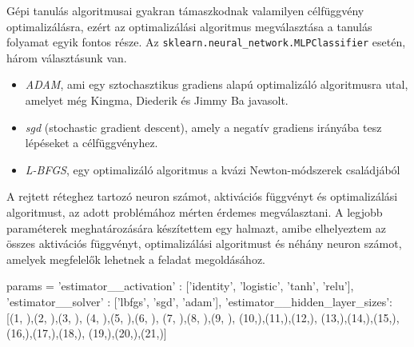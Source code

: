 Gépi tanulás algoritmusai gyakran támaszkodnak valamilyen célfüggvény optimalizálásra, ezért az optimalizálási algoritmus megválasztása a tanulás folyamat egyik fontos része.
Az \texttt{sklearn.neural\_network.MLPClassifier} esetén, három választásunk van.
\begin{itemize}
\item \textit{ADAM}, ami egy sztochasztikus gradiens alapú optimalizáló algoritmusra utal, amelyet még Kingma, Diederik és Jimmy Ba javasolt.
\item \textit{sgd} (stochastic gradient descent), amely a negatív gradiens irányába tesz lépéseket a célfüggvényhez.
\item \textit{L-BFGS}, egy  optimalizáló algoritmus a kvázi Newton-módszerek családjából
\end{itemize}

A rejtett réteghez tartozó neuron számot, aktivációs függvényt és optimalizálási algoritmust, az adott problémához mérten érdemes megválasztani. A legjobb paraméterek meghatározására készítettem egy halmazt, amibe elhelyeztem az összes aktivációs függvényt, optimalizálási algoritmust és néhány neuron számot, amelyek megfelelők lehetnek a feladat megoldásához.

\begin{python}
params = {
            'estimator__activation' : ['identity', 'logistic',
            			       'tanh', 'relu'],
            'estimator__solver' : ['lbfgs', 'sgd', 'adam'],
            'estimator__hidden_layer_sizes': [(1, ),(2, ),(3, ),
            				      (4, ),(5, ),(6, ),
            				      (7, ),(8, ),(9, ),
            				      (10,),(11,),(12,),
            				      (13,),(14,),(15,),
            				      (16,),(17,),(18,),
            				      (19,),(20,),(21,)]
}
\end{python}

